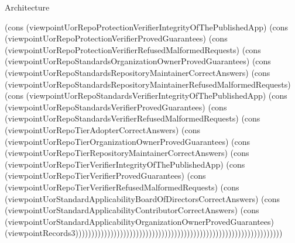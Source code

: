 \begin{lexlean}{Architecture}
\begin{semanticmodule}
{(cons (viewpointUorRepoProtectionVerifierIntegrityOfThePublishedApp) (cons (viewpointUorRepoProtectionVerifierProvedGuarantees) (cons (viewpointUorRepoProtectionVerifierRefusedMalformedRequests) (cons (viewpointUorRepoStandardsOrganizationOwnerProvedGuarantees) (cons (viewpointUorRepoStandardsRepositoryMaintainerCorrectAnswers) (cons (viewpointUorRepoStandardsRepositoryMaintainerRefusedMalformedRequests) (cons (viewpointUorRepoStandardsVerifierIntegrityOfThePublishedApp) (cons (viewpointUorRepoStandardsVerifierProvedGuarantees) (cons (viewpointUorRepoStandardsVerifierRefusedMalformedRequests) (cons (viewpointUorRepoTierAdopterCorrectAnswers) (cons (viewpointUorRepoTierOrganizationOwnerProvedGuarantees) (cons (viewpointUorRepoTierRepositoryMaintainerCorrectAnswers) (cons (viewpointUorRepoTierVerifierIntegrityOfThePublishedApp) (cons (viewpointUorRepoTierVerifierProvedGuarantees) (cons (viewpointUorRepoTierVerifierRefusedMalformedRequests) (cons (viewpointUorStandardApplicabilityBoardOfDirectorsCorrectAnswers) (cons (viewpointUorStandardApplicabilityContributorCorrectAnswers) (cons (viewpointUorStandardApplicabilityOrganizationOwnerProvedGuarantees) (viewpointRecords3)))))))))))))))))))))))))))))))))))))))))))))))))))))))))))))))))
}


\end{semanticmodule}
\end{lexlean}
